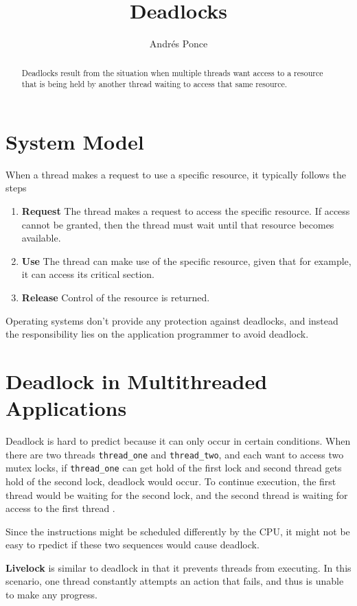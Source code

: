 \documentclass{tufte-handout}
\author{Andr\'es Ponce}
\title{Deadlocks}
\begin{document}
\maketitle
\begin{abstract}
Deadlocks result from the situation when multiple threads want access to 
a resource that is being held by another thread waiting to access that same
resource.
\end{abstract}

\section{System Model}

When a thread makes a request to use a specific resource, it typically follows
the steps
\begin{enumerate}
	\item \textbf{Request} The thread makes a request to access the specific resource.
							If access cannot be granted, then the thread must wait
							until that resource becomes available.
	\item \textbf{Use} The thread can make use of the specific resource, given that 
			for example, it can access its critical section.	
	\item \textbf{Release} Control of the resource is returned.
\end{enumerate}

Operating systems don't provide any protection against deadlocks, and instead the 
responsibility lies on the application programmer to avoid deadlock.

\section{Deadlock in Multithreaded Applications}

Deadlock is hard to predict because it can only occur in certain conditions.
When there are two threads \texttt{thread\_one} and \texttt{thread\_two}, and each want
to access two mutex locks, if \texttt{thread\_one} can get hold of the first lock 
and second thread gets hold of the second lock, deadlock would occur. To continue
execution, the first thread would be waiting for the second lock, and the second thread
is waiting for access to the first thread .

Since the instructions might be scheduled differently by the CPU, it might not be easy
to rpedict if these two sequences would cause deadlock.

\textbf{Livelock} is similar to deadlock in that it prevents threads from executing.
In this scenario, one thread constantly attempts an action that fails, and thus is
unable to make any progress.
\end{document}
